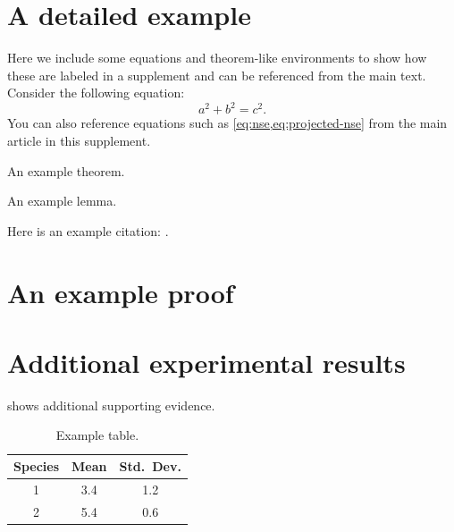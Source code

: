 \documentclass[review,supplement,hidelinks,onefignum,onetabnum]{siamart220329}
\begin{document}
\maketitle

\section{A detailed example}

Here we include some equations and theorem-like environments to show
how these are labeled in a supplement and can be referenced from the
main text.
Consider the following equation:
\begin{equation}
  \label{eq:suppa}
  a^2 + b^2 = c^2.
\end{equation}
You can also reference equations such as \cref{eq:nse,eq:projected-nse} 
from the main article in this supplement.

\lipsum[100-101]

\begin{theorem}
An example theorem.
\end{theorem}

\lipsum[102]
 
\begin{lemma}
An example lemma.
\end{lemma}

\lipsum[103-105]

Here is an example citation: \cite{KoMa14}.

\section{An example proof}
\label{sec:proof}

\lipsum[106-112]

\section{Additional experimental results}
 shows additional
supporting evidence. 

\begin{table}[htbp]
\footnotesize
  \caption{Example table.}\label{tab:smfoo}
\begin{center}
  \begin{tabular}{|c|c|c|} \hline
   Species & \bf Mean & \bf Std.~Dev. \\ \hline
    1 & 3.4 & 1.2 \\
    2 & 5.4 & 0.6 \\ \hline
  \end{tabular}
\end{center}
\end{table}




\end{document}
